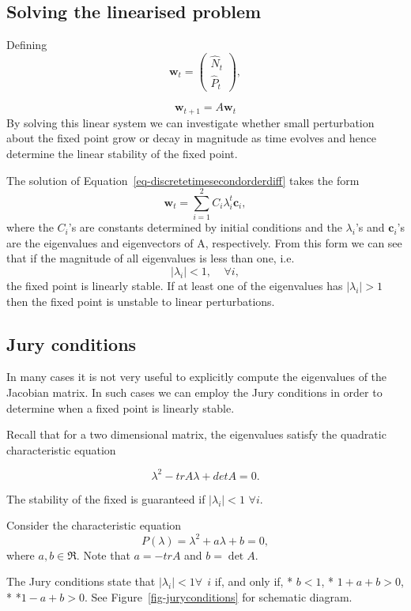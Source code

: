 \documentclass[
  letterpaper,
  DIV=11,
  numbers=noendperiod]{scrreprt}
\begin{document}
\subsection{Solving the linearised
problem}\label{solving-the-linearised-problem}

Defining \[
\mathbf{w}_t=\left(\begin{array}{c}\hat{N}_{t} \\ \hat{P}_{t}\end{array}\right), 
\]

\[
\mathbf{w}_{t+1}=A\mathbf{w}_{t}
\] By solving this linear system we can investigate whether small
perturbation about the fixed point grow or decay in magnitude as time
evolves and hence determine the linear stability of the fixed point.

The solution of Equation~\ref{eq-discretetimesecondorderdiff} takes the
form \[
\mathbf{w}_t=\sum_{i=1}^2 C_i \lambda_i^t\mathbf{c}_i,
\] where the \(C_i\)'s are constants determined by initial conditions
and the \(\lambda_i\)'s and \(\mathbf{c}_i\)'s are the eigenvalues and
eigenvectors of A, respectively. From this form we can see that if the
magnitude of all eigenvalues is less than one, i.e. \[
|\lambda_i|<1, \ \ \ \ \ \forall i,
\] the fixed point is linearly stable. If at least one of the
eigenvalues has \(|\lambda_i|>1\) then the fixed point is unstable to
linear perturbations.

\subsection{Jury conditions}\label{jury-conditions}

In many cases it is not very useful to explicitly compute the
eigenvalues of the Jacobian matrix. In such cases we can employ the Jury
conditions in order to determine when a fixed point is linearly stable.

Recall that for a two dimensional matrix, the eigenvalues satisfy the
quadratic characteristic equation

\[
\lambda^2- trA \lambda + detA=0.
\]

The stability of the fixed is guaranteed if \(|\lambda _i|<1\)
\(\forall i\).

Consider the characteristic equation \[
P(\lambda)=\lambda^2 + a \lambda +b=0,
\] where \(a,b \in \Re\). Note that \(a=-tr{A}\) and \(b=\det{A}\).

The Jury conditions state that \(|\lambda_i |<1 \forall \ \  i\) if, and
only if, * \(b<1\), * \(1+a+b>0\), * *\(1-a+b>0\). See
Figure~\ref{fig-juryconditions} for schematic diagram.
\end{document}
